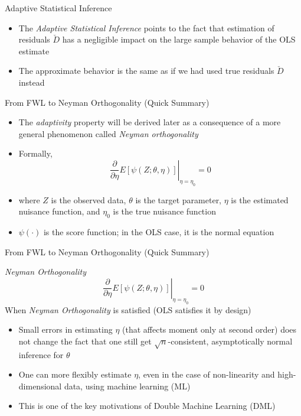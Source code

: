 \documentclass[aspectratio=1610,12pt,xcolor=dvipsnames]{beamer}
\begin{document}
\begin{frame}{Adaptive Statistical Inference}
 \begin{itemize}
     \item The \textit{Adaptive Statistical Inference} points to the fact that estimation of residuals $\check{D}$ has a negligible impact on the large sample behavior of the OLS estimate
     \item The approximate behavior is the same as if we had used true residuals $\check D$ instead
 \end{itemize}
\end{frame}

\begin{frame}{From FWL to Neyman Orthogonality (Quick Summary)}

\begin{itemize}
    \item The \textit{adaptivity} property will be derived later as a consequence of a more general phenomenon called \textit{Neyman orthogonality}
    \item Formally, \[
    \left.\frac{\partial}{\partial \eta} E[\psi(Z;\theta,\eta)]\right|_{\eta=\eta_0} = 0
    \]
    \item where $Z$ is the observed data, $\theta$ is the target parameter, $\eta$ is the estimated nuisance function, and $\eta_0$ is the true nuisance function
    \item $\psi(\cdot)$ is the score function; in the OLS case, it is the normal equation
\end{itemize}
\end{frame}

\begin{frame}{From FWL to Neyman Orthogonality (Quick Summary)}

\textit{Neyman Orthogonality}
\[
    \left.\frac{\partial}{\partial \eta} E[\psi(Z;\theta,\eta)]\right|_{\eta=\eta_0} = 0
    \]
When \textit{Neyman Orthogonality} is satisfied (OLS satisfies it by design)
    \begin{itemize}
        \item Small errors in estimating $\eta$ (that affects moment only at second order) does not change the fact that one still get $\sqrt{n}$-consistent, asymptotically normal inference for $\theta$
        \item One can more flexibly estimate $\eta$, even in the case of non-linearity and high-dimensional data, using machine learning (ML)
        \item This is one of the key motivations of Double Machine Learning (DML)
    \end{itemize}
\end{frame}


\end{document}
